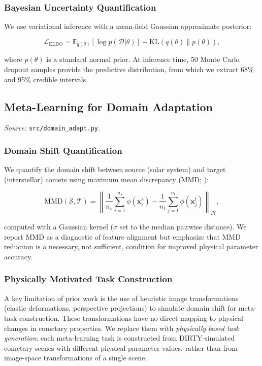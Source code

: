 \documentclass[usenatbib]{mnras}
\begin{document}
\subsubsection{Bayesian Uncertainty Quantification}

We use variational inference with a mean-field Gaussian approximate posterior:

\begin{equation}\label{eq:elbo}
\mathcal{L}_{\text{ELBO}} = \mathbb{E}_{q(\theta)}[\log p(\mathcal{D}|\theta)] - \text{KL}(q(\theta) \| p(\theta)),
\end{equation}

where $p(\theta)$ is a standard normal prior. At inference time, 50 Monte Carlo dropout samples \citep{gal16} provide the predictive distribution, from which we extract 68\% and 95\% credible intervals.

\subsection{Meta-Learning for Domain Adaptation}\label{sec:domain_adapt}

\textit{Source:} \texttt{src/domain\_adapt.py}.

\subsubsection{Domain Shift Quantification}

We quantify the domain shift between source (solar system) and target (interstellar) comets using maximum mean discrepancy (MMD; \citealt{gretton12}):

\begin{equation}\label{eq:mmd}
\text{MMD}(\mathcal{S}, \mathcal{T}) = \left\| \frac{1}{n_s}\sum_{i=1}^{n_s} \phi(\mathbf{x}_i^s) - \frac{1}{n_t}\sum_{j=1}^{n_t} \phi(\mathbf{x}_j^t) \right\|_{\mathcal{H}},
\end{equation}

computed with a Gaussian kernel ($\sigma$ set to the median pairwise distance). We report MMD as a diagnostic of feature alignment but emphasize that MMD reduction is a necessary, not sufficient, condition for improved physical parameter accuracy.

\subsubsection{Physically Motivated Task Construction}

A key limitation of prior work is the use of heuristic image transformations (elastic deformations, perspective projections) to simulate domain shift for meta-task construction. These transformations have no direct mapping to physical changes in cometary properties. We replace them with \textit{physically based task generation}: each meta-learning task is constructed from DIRTY-simulated cometary scenes with different physical parameter values, rather than from image-space transformations of a single scene.
\end{document}
